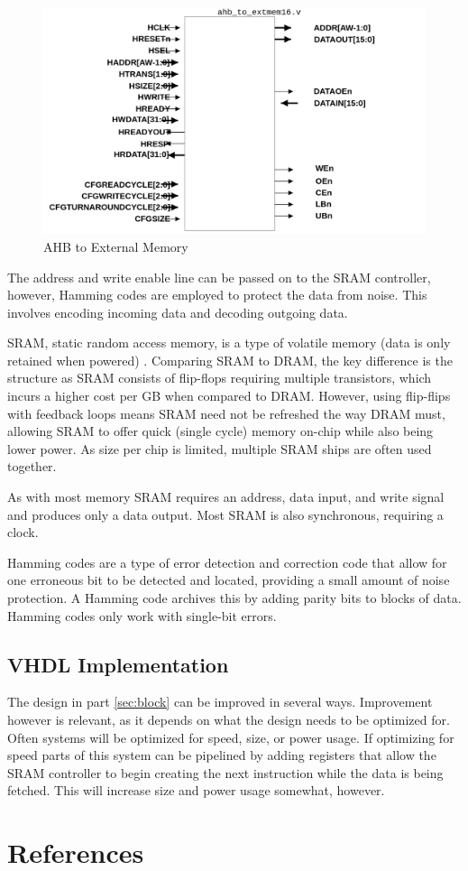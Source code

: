 \documentclass[11pt]{article}
\begin{document}
\begin{figure}[H]        
    \centering
    \includegraphics[width=.5\textwidth]{ahb_ext.png}
    \caption{AHB to External Memory\cite{sram_arm}}
    \label{fig:ahb_ext}
\end{figure} 

The address and write enable line can be passed on to the SRAM controller, however, Hamming codes are employed to protect the data from noise.
This involves encoding incoming data and decoding outgoing data.

SRAM, static random access memory, is a type of volatile memory (data is only retained when powered) \cite{dally}. 
Comparing SRAM to DRAM, the key difference is the structure as SRAM consists of flip-flops requiring multiple transistors, which incurs a higher cost per GB when compared to DRAM.
However, using flip-flips with feedback loops means SRAM need not be refreshed the way DRAM must, allowing SRAM to offer quick (single cycle) memory on-chip while also being lower power.
As size per chip is limited, multiple SRAM ships are often used together.

As with most memory SRAM requires an address, data input, and write signal and produces only a data output. Most SRAM is also synchronous, requiring a clock.

Hamming codes are a type of error detection and correction code that allow for one erroneous bit to be detected and located, providing a small amount of noise protection.
A Hamming code archives this by adding parity bits to blocks of data.
Hamming codes only work with single-bit errors. \cite{hamming} \cite{ham}



\subsection{VHDL Implementation}

The design in part \ref{sec:block} can be improved in several ways.
Improvement however is relevant, as it depends on what the design needs to be optimized for.
Often systems will be optimized for speed, size, or power usage.
If optimizing for speed parts of this system can be pipelined by adding registers that allow the SRAM controller to begin creating the next instruction while the data is being fetched.
This will increase size and power usage somewhat, however. 

\pagebreak
\appendix
\renewcommand{\thesection}{\Roman{section}}
\section{References}
\printbibliography[heading=none]
\end{document}
